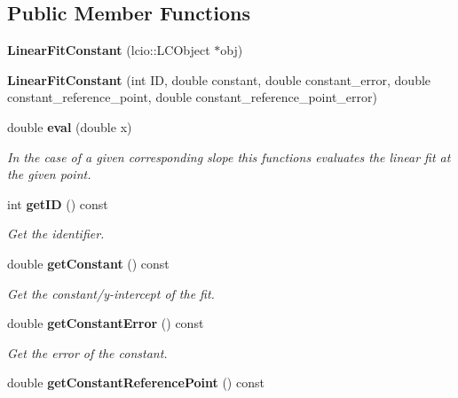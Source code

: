 \subsection*{Public Member Functions}
\begin{DoxyCompactItemize}
\item 
{\bfseries Linear\-Fit\-Constant} (lcio\-::\-L\-C\-Object $\ast$obj)\label{classCALICE_1_1LinearFitConstant_aad304d55b35c64a6ccc10f6678bea491}

\item 
{\bfseries Linear\-Fit\-Constant} (int I\-D, double constant, double constant\-\_\-error, double constant\-\_\-reference\-\_\-point, double constant\-\_\-reference\-\_\-point\-\_\-error)\label{classCALICE_1_1LinearFitConstant_ab237e9f47438621313de684f516b5eea}

\item 
double {\bf eval} (double x)
\begin{DoxyCompactList}\small\item\em In the case of a given corresponding slope this functions evaluates the linear fit at the given point. \end{DoxyCompactList}\item 
int {\bf get\-I\-D} () const \label{classCALICE_1_1LinearFitConstant_ad6dac20732c9065577e04b1057d4cba5}

\begin{DoxyCompactList}\small\item\em Get the identifier. \end{DoxyCompactList}\item 
double {\bf get\-Constant} () const \label{classCALICE_1_1LinearFitConstant_a4d3578f48272ce09e288dde99c7081bf}

\begin{DoxyCompactList}\small\item\em Get the constant/y-\/intercept of the fit. \end{DoxyCompactList}\item 
double {\bf get\-Constant\-Error} () const \label{classCALICE_1_1LinearFitConstant_a91e9290960a2d85f39938b46cfe3f92b}

\begin{DoxyCompactList}\small\item\em Get the error of the constant. \end{DoxyCompactList}\item 
double {\bf get\-Constant\-Reference\-Point} () const \label{classCALICE_1_1LinearFitConstant_aa8748414106f0a3dc6bf7b5f406e2b88}


\end{DoxyCompactItemize}
